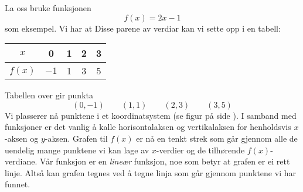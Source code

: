 La oss bruke funksjonen 
\[ f(x)=2x-1 \]
som eksempel. Vi har at
Disse parene av verdiar kan vi sette opp i en tabell:
	\begin{center}
	\begin{tabular}{c | c |c |c|c}
		$ x $ & 0 & 1 & 2 & 3 \\ \hline
		$ f(x) $ &$  -1 $ & 1&3 &5
	\end{tabular}
\end{center}
Tabellen over gir punkta
\[ (0, -1)\quad\quad(1, 1)\quad\quad(2, 3)\quad\quad(3, 5) \]
Vi plasserer nå punktene i et koordinatsystem (se figur på side \pageref{funkfig}). I samband med funksjoner er det vanlig å kalle horisontalaksen og vertikalaksen for henholdsvis $ x $-aksen og $ y $-aksen. 
Grafen til $ f(x) $ er nå en tenkt strek som går gjennom alle de uendelig mange punktene vi kan lage av $ x$-verdier og de tilhørende $ f(x) $-verdiane. Vår funksjon er en \textit{lineær} funksjon, noe som betyr at grafen er ei rett linje. Altså kan grafen tegnes ved å tegne linja som går gjennom punktene vi har funnet.\vsk


